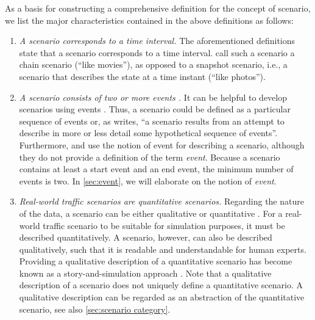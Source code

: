 \cstarte As a basis for constructing a comprehensive definition for the concept of scenario, we list the major characteristics contained in the above definitions as follows:\cende
\begin{enumerate}
	\item \textit{A scenario corresponds to a time interval.}
	The aforementioned definitions \autocite{go2004blind, geyer2014, ulbrich2015, elrofai2016scenario} state that a scenario corresponds to a time interval. \textcite{vannotten2003updated} call such a scenario a chain scenario (``like movies''), as opposed to a snapshot scenario, i.e., a scenario that describes the state at a time instant (``like photos''). %

	\item \textit{A scenario consists of \cstartb two or more \cendb events \autocite{vannotten2003updated, go2004blind, geyer2014, ulbrich2015, kahn1962}.}
	It can be helpful to develop scenarios using events \autocite{bishop2007scentechniques}. Thus, a scenario could be defined as a particular sequence of events or, as \textcite[p.~143]{kahn1962} writes, ``a scenario results from an attempt to describe in more or less detail some hypothetical sequence of events''. Furthermore, \textcite{geyer2014} and \textcite{ulbrich2015} use the notion of event for describing a scenario, although they do not provide a definition of the term \emph{event}. 
	\cstartb Because a scenario contains at least a start event and an end event, the minimum number of events is two. \cendb
	In \cref{sec:event}, we will elaborate on the notion of \emph{event}.

	\item \textit{Real-world traffic scenarios are quantitative scenarios.}
	Regarding the nature of the data, a scenario can be either qualitative or quantitative \autocite{vannotten2003updated}. 
	\cstartd For a real-world traffic scenario to be suitable for simulation purposes, it must be described quantitatively. \cendd
	A scenario, however, can also be described qualitatively, such that it is readable and understandable for human experts. Providing a qualitative description of a quantitative scenario has become known as a story-and-simulation approach \autocite{alcamo2001scenarios}. 
	Note that a qualitative description of a scenario does not uniquely define a quantitative scenario. A qualitative description can be regarded as an abstraction of the quantitative scenario, see also \cref{sec:scenario category}.


\end{enumerate}
